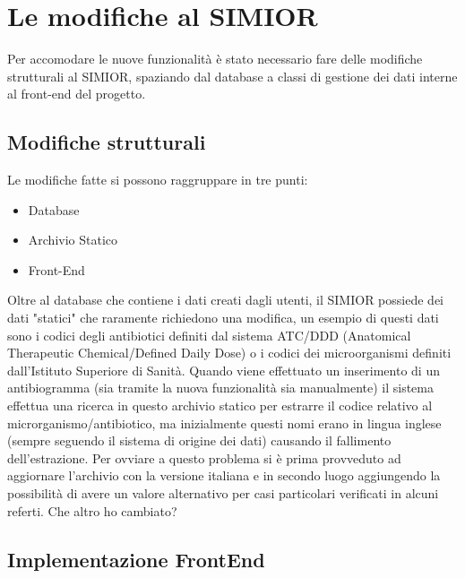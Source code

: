 \chapter{Le modifiche al SIMIOR}
Per accomodare le nuove funzionalità è stato necessario fare delle modifiche strutturali al SIMIOR, spaziando dal database a classi di gestione dei dati interne al front-end del progetto.
\section{Modifiche strutturali}
Le modifiche fatte si possono raggruppare in tre punti:
\begin{itemize}
	\item Database
	\item Archivio Statico
	\item Front-End
\end{itemize}

Oltre al database che contiene i dati creati dagli utenti, il SIMIOR possiede dei dati "statici" che raramente richiedono una modifica, un esempio di questi dati sono i codici degli antibiotici definiti dal sistema ATC/DDD (Anatomical Therapeutic Chemical/Defined Daily Dose) o i codici dei microorganismi definiti dall'Istituto Superiore di Sanità.
Quando viene effettuato un inserimento di un antibiogramma (sia tramite la nuova funzionalità sia manualmente) il sistema effettua una ricerca in questo archivio statico per estrarre il codice relativo al microrganismo/antibiotico, ma inizialmente questi nomi erano in lingua inglese (sempre seguendo il sistema di origine dei dati) causando il fallimento dell'estrazione. Per ovviare a questo problema si è prima provveduto ad aggiornare l'archivio con la versione italiana e in secondo luogo aggiungendo la possibilità di avere un valore alternativo per casi particolari verificati in alcuni referti.
Che altro ho cambiato?
\section{Implementazione FrontEnd}
